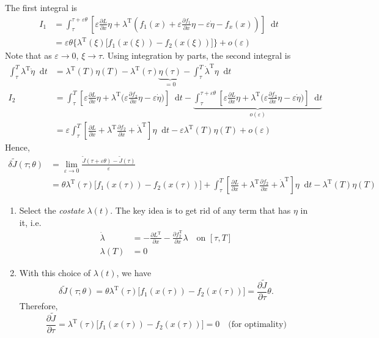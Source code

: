 \documentclass[letterpaper,12pt,titlepage]{report}
\newcommand*\dif{\mathop{}\!\mathrm{d}}
\newcommand{\trans}{^\text{T}}
\newcommand*\pder[2]{\frac{\partial #1}{\partial #2}}
\theoremstyle{plain}
\theoremstyle{definition}
\begin{document}
\noindent
The first integral is
\begin{align}
  I_1 &= \int_\tau^{\tau+\varepsilon\theta} \left[ \varepsilon\pder{L}{x}\eta + \lambda\trans (f_1(x)+\varepsilon\pder{f_1}{x}\eta-\varepsilon\dot\eta-f_x(x)) \right] \dif t \\
  &= \varepsilon\theta \Big\{ \lambda\trans(\xi) \big[ f_1(x(\xi)) - f_2(x(\xi)) \big] \Big\} + o(\varepsilon)
\end{align}
Note that as $\varepsilon\to0$, $\xi\to\tau$. Using integration by parts, the second integral is
\begin{align}
  \int_\tau^T \lambda\trans \dot\eta \dif t &= \lambda\trans(T) \eta(T) - \lambda\trans(\tau) \underbrace{\eta(\tau)}_{=0} - \int_\tau^T \dot\lambda\trans \eta \dif t \\
  I_2 &= \int_\tau^T \left[ \varepsilon\pder{L}{x}\eta + \lambda\trans \Big( \varepsilon\pder{f_2}{x}\eta - \varepsilon\dot\eta \Big) \right] \dif t - \underbrace{ \int_\tau^{\tau+\varepsilon\theta} \left[ \varepsilon\pder{L}{x}\eta + \lambda\trans \Big( \varepsilon\pder{f_2}{x}\eta - \varepsilon\dot\eta \Big) \right] \dif t }_{o(\varepsilon)} \\
                                            &= \varepsilon \int_\tau^T \left[ \pder{L}{x} + \lambda\trans \pder{f_2}{x} + \dot\lambda\trans \right] \eta \dif t - \varepsilon \lambda\trans(T)\eta(T) + o(\varepsilon)
\end{align}
Hence,
\begin{align}
  \delta\tilde J(\tau;\theta) &= \lim_{\varepsilon\to0} \frac{\tilde J(\tau+\varepsilon\theta) - \tilde J(\tau)}{\varepsilon} \\
                              &= \theta\lambda\trans(\tau) \Big[ f_1(x(\tau)) - f_2(x(\tau)) \Big] + \int_\tau^T \left[ \pder{L}{x} + \lambda\trans \pder{f_2}{x} + \dot\lambda\trans \right] \eta \dif t - \lambda\trans(T)\eta(T)
\end{align}

\begin{enumerate}[resume*]
\item Select the \emph{costate} $\lambda(t)$. The key idea is to get rid of any term that has $\eta$ in it, i.e.
  \begin{align}
    \dot\lambda &= -\pder{L\trans}{x} - \pder{f_2\trans}{x} \lambda \quad \text{on } [\tau,T] \\
    \lambda(T) &= 0
  \end{align}
\item With this choice of $\lambda(t)$, we have
  \[ \delta\tilde J(\tau;\theta) = \theta\lambda\trans(\tau) \Big[ f_1(x(\tau)) - f_2(x(\tau)) \Big] = \pder{\tilde J}{\tau} \theta. \]
  Therefore,
  \[ \pder{\tilde J}{\tau} = \lambda\trans(\tau) \Big[ f_1(x(\tau)) - f_2(x(\tau)) \Big] = 0 \quad \text{(for optimality)} \]
\end{enumerate}
\end{document}

